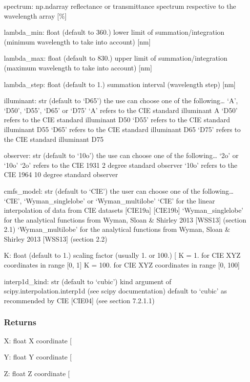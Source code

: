 \documentclass[letterpaper,10pt,english]{sphinxmanual}
\begin{document}
\begin{fulllineitems}
\sphinxAtStartPar
spectrum: np.ndarray
reflectance or transmittance spectrum respective to the wavelength array {[}\%{]}

\sphinxAtStartPar
lambda\_min: float (default to 360.)
lower limit of summation/integration (minimum wavelength to take into account) {[}nm{]}

\sphinxAtStartPar
lambda\_max: float (default to 830.)
upper limit of summation/integration (maximum wavelength to take into account) {[}nm{]}

\sphinxAtStartPar
lambda\_step: float (default to 1.)
summation interval (wavelength step) {[}nm{]}

\sphinxAtStartPar
illuminant: str (default to ‘D65’)
the use can choose one of the following… ‘A’, ‘D50’, ‘D55’, ‘D65’ or ‘D75’
‘A’ refers to the CIE standard illuminant A
‘D50’ refers to the CIE standard illuminant D50
‘D55’ refers to the CIE standard illuminant D55
‘D65’ refers to the CIE standard illuminant D65
‘D75’ refers to the CIE standard illuminant D75

\sphinxAtStartPar
observer: str (default to ‘10o’)
the use can choose one of the following… ‘2o’ or ‘10o’
‘2o’ refers to the CIE 1931 2 degree standard observer
‘10o’ refers to the CIE 1964 10 degree standard observer

\sphinxAtStartPar
cmfs\_model: str (default to ‘CIE’)
the user can choose one of the following… ‘CIE’, ‘Wyman\_singlelobe’ or ‘Wyman\_multilobe’
‘CIE’ for the linear interpolation of data from CIE datasets {[}CIE19a{]} {[}CIE19b{]}
‘Wyman\_singlelobe’ for the analytical functions from Wyman, Sloan \& Shirley 2013 {[}WSS13{]} (section 2.1)
‘Wyman\_multilobe’ for the analytical functions from Wyman, Sloan \& Shirley 2013 {[}WSS13{]} (section 2.2)

\sphinxAtStartPar
K: float (default to 1.)
scaling factor (usually 1. or 100.) {[}\sphinxhyphen{}{]}
K = 1. for CIE XYZ coordinates in range {[}0, 1{]}
K = 100. for CIE XYZ coordinates in range {[}0, 100{]}

\sphinxAtStartPar
interp1d\_kind: str (default to ‘cubic’)
kind argument of scipy.interpolation.interp1d (see scipy documentation)
default to ‘cubic’ as recommended by CIE {[}CIE04{]} (see section 7.2.1.1)


\subsubsection{Returns}
\label{\detokenize{07_colors:id21}}
\sphinxAtStartPar
X: float
X coordinate {[}\sphinxhyphen{}{]}

\sphinxAtStartPar
Y: float
Y coordinate {[}\sphinxhyphen{}{]}

\sphinxAtStartPar
Z: float
Z coordinate {[}\sphinxhyphen{}{]}

\end{fulllineitems}
\end{document}

